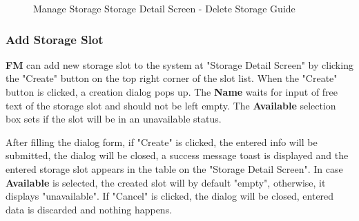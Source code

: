 \begin{figure}[H]
	\centering

    \caption{Manage Storage Storage Detail Screen - Delete Storage Guide}
	\label{fig:MSobjDeleteGuide}
\end{figure}



\subsubsection{Add Storage Slot}

\textbf{FM} can add new storage slot to the system at "Storage Detail Screen" by clicking the "Create" button on the top right corner of the slot list.
When the "Create" button is clicked, a creation dialog pops up. The \textbf{Name} waits for input of free text of the storage slot and should not be left empty. The \textbf{Available} selection box sets if the slot will be in an unavailable status.

After filling the dialog form, if "Create" is clicked, the entered info will be submitted, the dialog will be closed, a success message toast is displayed and the entered storage slot appears in the table on the "Storage Detail Screen". In case \textbf{Available} is selected, the created slot will by default "empty", otherwise, it displays "unavailable". If "Cancel" is clicked, the dialog will be closed, entered data is discarded and nothing happens.

